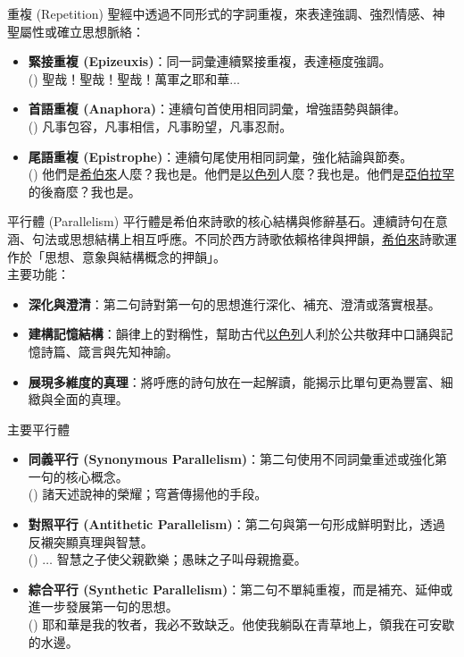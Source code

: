 \documentclass{beamer}
\begin{document}
\begin{frame}{重複 (Repetition)}
  聖經中透過不同形式的字詞重複，來表達強調、強烈情感、神聖屬性或確立思想脈絡\parencite{Repetition}：
  \begin{itemize}
    \item\textbf{緊接重複 (Epizeuxis)}：同一詞彙連續緊接重複，表達極度強調。\\
      () 聖哉！聖哉！聖哉！萬軍之耶和華$\dots$
    \item\textbf{首語重複 (Anaphora)}：連續句首使用相同詞彙，增強語勢與韻律。\\
      () 凡事包容，凡事相信，凡事盼望，凡事忍耐。
    \item\textbf{尾語重複 (Epistrophe)}：連續句尾使用相同詞彙，強化結論與節奏。\\
      () 他們是\uline{希伯來}人麼？我也是。他們是\uline{以色列}人麼？我也是。他們是\uline{亞伯拉罕}的後裔麼？我也是。
  \end{itemize}
\end{frame}

\begin{frame}{平行體 (Parallelism)}
  平行體\parencite{Parallelism}是希伯來詩歌的核心結構與修辭基石。連續詩句在意涵、句法或思想結構上相互呼應。不同於西方詩歌依賴格律與押韻，\uline{希伯來}詩歌運作於「思想、意象與結構概念的押韻」。\\
  主要功能：
  \begin{itemize}
    \item \textbf{深化與澄清}：第二句詩對第一句的思想進行深化、補充、澄清或落實根基。
    \item \textbf{建構記憶結構}：韻律上的對稱性，幫助古代\uline{以色列}人利於公共敬拜中口誦與記憶詩篇、箴言與先知神諭。
    \item \textbf{展現多維度的真理}：將呼應的詩句放在一起解讀，能揭示比單句更為豐富、細緻與全面的真理。
  \end{itemize}
\end{frame}

\begin{frame}{主要平行體}
  \begin{itemize}
    \item\textbf{同義平行 (Synonymous Parallelism)}：第二句使用不同詞彙重述或強化第一句的核心概念。\\
      () 諸天述說神的榮耀；穹蒼傳揚他的手段。
    \item\textbf{對照平行 (Antithetic Parallelism)}：第二句與第一句形成鮮明對比，透過反襯突顯真理與智慧。\\
      () $\dots$ 智慧之子使父親歡樂；愚昧之子叫母親擔憂。
    \item\textbf{綜合平行 (Synthetic Parallelism)}：第二句不單純重複，而是補充、延伸或進一步發展第一句的思想。\\
      () 耶和華是我的牧者，我必不致缺乏。他使我躺臥在青草地上，領我在可安歇的水邊。
  \end{itemize}
\end{frame}
\end{document}
